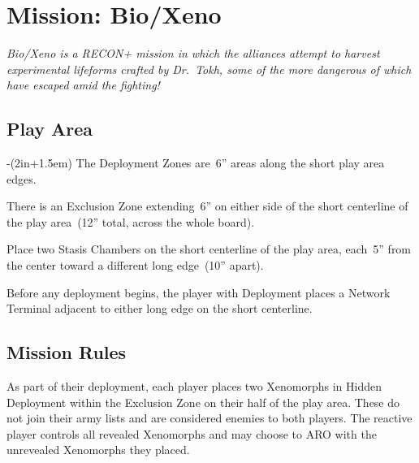 \chapter{Mission: Bio/Xeno}

\emph{\emph{Bio/Xeno} is a RECON+ mission in which the alliances
  attempt to harvest experimental lifeforms crafted by Dr.~Tokh, some
  of the more dangerous of which have escaped amid the fighting!}

\section{Play Area}
\vspace{-2\parskip}
\noindent\begin{stdminipage}{\linewidth-(2in+1.5em)}
\vspace{0pt}   
\noindent
The Deployment Zones are~6'' areas along the short play area edges.

There is an Exclusion Zone extending~6'' on either side of the short
centerline of the play area~(12'' total, across the whole board).


Place two Stasis Chambers on the short centerline of the play area,
each~5'' from the center toward a different long edge~(10'' apart).

Before any deployment begins, the player with Deployment places a
Network Terminal adjacent to either long edge on the short centerline.

\section{Mission Rules}

As part of their deployment, each player places two Xenomorphs in
Hidden Deployment within the Exclusion Zone on their half of the play
area.  These do not join their army lists and are considered enemies
to both players.  The reactive player controls all revealed Xenomorphs
and may choose to ARO with the unrevealed Xenomorphs they placed.

\noindent\begin{minipage}{\linewidth}\center
\setlength\fboxrule{2pt}  
\end{minipage}
\end{stdminipage}
